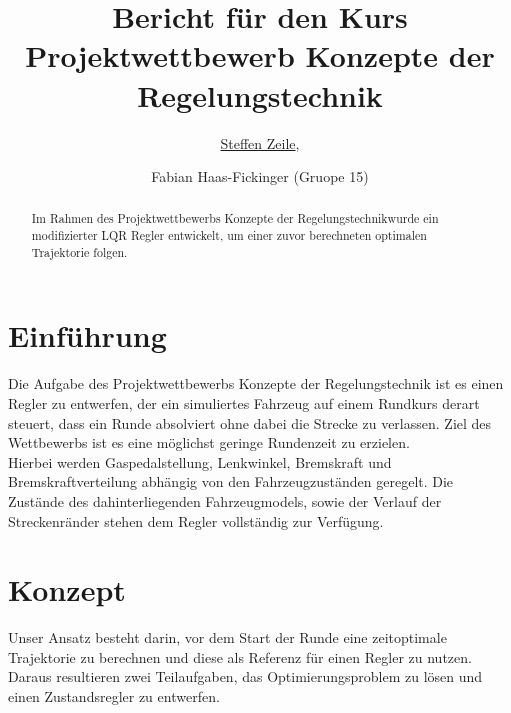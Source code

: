 \documentclass[pdf]{ifacconf}
\begin{document}
\begin{frontmatter}

\title{Bericht für den Kurs \glqq Projektwettbewerb Konzepte der Regelungstechnik\grqq}


\author{\underline{Steffen Zeile},} 
\author{Fabian Haas-Fickinger (Gruope 15)} 

\begin{abstract}                          %
Im Rahmen des \glqq Projektwettbewerbs Konzepte der Regelungstechnik\grqq  wurde ein modifizierter LQR Regler entwickelt, um einer zuvor berechneten optimalen Trajektorie folgen.\end{abstract}

\end{frontmatter}

\section{Einführung}
Die Aufgabe des Projektwettbewerbs Konzepte der Regelungstechnik ist es einen Regler zu entwerfen, der ein simuliertes Fahrzeug auf einem Rundkurs derart steuert, dass ein Runde absolviert ohne dabei die Strecke zu verlassen. Ziel des Wettbewerbs ist es eine möglichst geringe Rundenzeit zu erzielen.\\
Hierbei werden Gaspedalstellung, Lenkwinkel, Bremskraft und Bremskraftverteilung abhängig von den Fahrzeugzuständen geregelt. Die Zustände des dahinterliegenden Fahrzeugmodels, sowie der Verlauf der Streckenränder stehen dem Regler vollständig zur Verfügung.

\section{Konzept}
Unser Ansatz besteht darin, vor dem Start der Runde eine zeitoptimale Trajektorie zu berechnen und diese als Referenz für einen Regler zu nutzen. Daraus resultieren zwei Teilaufgaben, das Optimierungsproblem zu lösen und einen Zustandsregler zu entwerfen.
\end{document}
